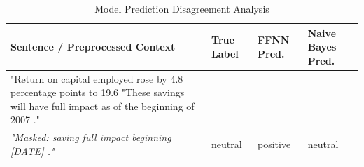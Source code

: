 \begin{table}[h]
\centering
\caption{Model Prediction Disagreement Analysis}\n\begin{tabular}{|p{8cm}|p{2cm}|p{2cm}|p{2cm}|}
\hline
\textbf{Sentence / Preprocessed Context} & \textbf{True Label} & \textbf{FFNN Pred.} & \textbf{Naive Bayes Pred.}  \\ \hline
"Return on capital employed rose by 4.8 percentage points to 19.6 %
"These savings will have full impact as of the beginning of 2007 ." \\ \textit{"Masked: saving full impact beginning [DATE] ."} & neutral & positive & neutral  \\ \hline
\end{tabular}
\end{table}